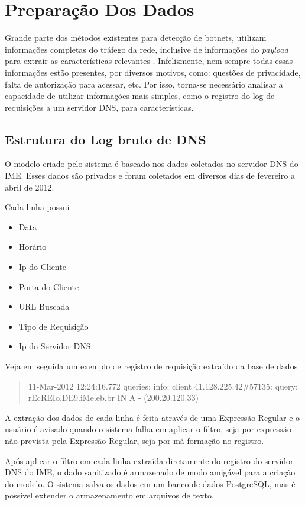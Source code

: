 \chapter{Preparação Dos Dados}
Grande parte dos métodos existentes para detecção de botnets, utilizam informações completas do tráfego da rede, inclusive de informações do \textit{payload} para extrair as características relevantes \citep{krmicek2011inspecting}. Infelizmente, nem sempre todas essas informações estão presentes, por diversos motivos, como: questões de privacidade, falta de autorização para acessar, etc. Por isso, torna-se necessário analisar a capacidade de utilizar informações mais simples, como o registro do log de requisições a um servidor DNS, para características.

\section{Estrutura do Log bruto de DNS }
O modelo criado pelo sistema é baseado nos dados coletados no servidor DNS do IME. Esses dados são privados e foram coletados em diversos dias de fevereiro a abril de 2012.

Cada linha possui
\begin{itemize}
\item Data
\item Horário
\item Ip do Cliente
\item Porta do Cliente
\item URL Buscada
\item Tipo de Requisição
\item Ip do Servidor DNS
\end{itemize}

Veja em seguida um exemplo de registro de requisição extraído da base de dados

\begin{quote}
11-Mar-2012 12:24:16.772 queries: info: client 41.128.225.42\#57135: query: rEcREIo.DE9.iMe.eb.br IN A - (200.20.120.33)
\end{quote}

A extração dos dados de cada linha é feita através de uma Expressão Regular e o usuário é avisado quando o sistema falha em aplicar o filtro, seja por expressão não prevista pela Expressão Regular, seja por má formação no registro. 

Após aplicar o filtro em cada linha extraída diretamente do registro do servidor DNS do IME, o dado sanitizado é armazenado de modo amigável para a criação do modelo. O sistema salva os dados em um banco de dados PostgreSQL, mas é possível extender o armazenamento em arquivos de texto.

